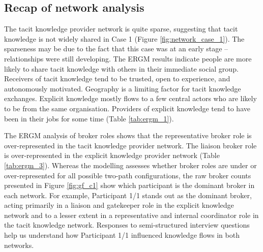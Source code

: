 \subsection{Recap of network analysis}

The tacit knowledge provider network is quite sparse, suggesting that tacit knowledge is not widely shared in Case 1 (Figure \ref{fig:network_case_1}). The sparseness may be due to the fact that this case was at an early stage -- relationships were still developing. The ERGM results indicate people are more likely to share tacit knowledge with others in their immediate social group. Receivers of tacit knowledge tend to be trusted, open to experience, and autonomously motivated. Geography is a limiting factor for tacit knowledge exchanges. Explicit knowledge mostly flows to a few central actors who are likely to be from the same organisation. Providers of explicit knowledge tend to have been in their jobs for some time (Table \ref{tab:ergm_1}). \medskip

The ERGM analysis of broker roles shows that the representative broker role is over-represented in the tacit knowledge provider network. The liaison broker role is over-represented in the explicit knowledge provider network (Table \ref{tab:ergm_3}). Whereas the modelling assesses whether broker roles are under or over-represented for all possible two-path configurations, the raw broker counts presented in Figure \ref{fig:gf_c1} show which participant is the dominant broker in each network. For example, Participant 1/1 stands out as the dominant broker, acting primarily in a liaison and gatekeeper role in the explicit knowledge network and to a lesser extent in a representative and internal coordinator role in the tacit knowledge network. Responses to semi-structured interview questions help us understand how Participant 1/1 influenced knowledge flows in both networks.  

